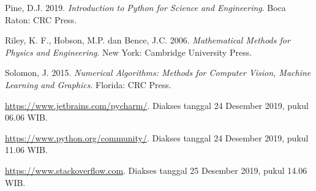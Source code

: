 \begin{thebibliography}{99}
		 Pine, D.J. 2019. \textit{Introduction to Python for Science and Engineering}. Boca Raton: CRC Press. %

		 Riley, K. F., Hobson, M.P. dan Bence, J.C. 2006. \textit{Mathematical Methods for Physics and Engineering}. New York: Cambridge University Press.%


		 Solomon, J. 2015. \textit{Numerical Algorithms: Methods for Computer Vision, Machine Learning and Graphics}. Florida: CRC Press.%

		\url{https://www.jetbrains.com/pycharm/}. Diakses tanggal 24 Desember 2019, pukul 06.06 WIB. %

		\url{https://www.python.org/community/}. Diakses tanggal 24 Desember 2019, pukul 11.06 WIB.%

		\url{https://www.stackoverflow.com}. Diakses tanggal 25 Desember 2019, pukul 14.06 WIB.%

\end{thebibliography}